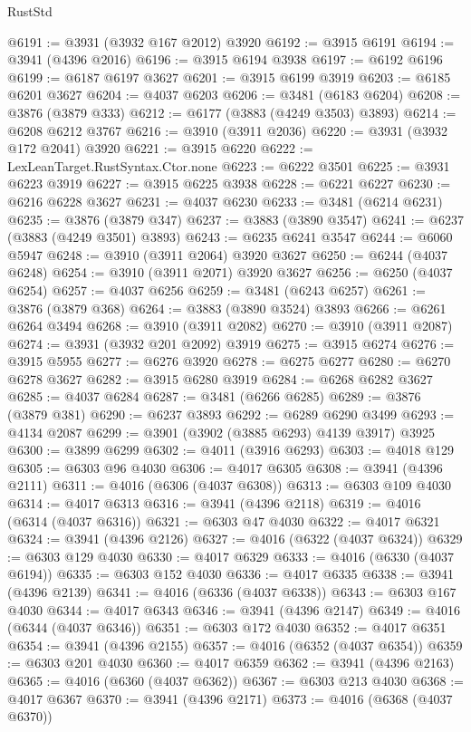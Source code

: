 \begin{lexlean}{RustStd}
\begin{coremodule}
@6191 := @3931 (@3932 @167 @2012) @3920
@6192 := @3915 @6191
@6194 := @3941 (@4396 @2016)
@6196 := @3915 @6194 @3938
@6197 := @6192 @6196
@6199 := @6187 @6197 @3627
@6201 := @3915 @6199 @3919
@6203 := @6185 @6201 @3627
@6204 := @4037 @6203
@6206 := @3481 (@6183 @6204)
@6208 := @3876 (@3879 @333)
@6212 := @6177 (@3883 (@4249 @3503) @3893)
@6214 := @6208 @6212 @3767
@6216 := @3910 (@3911 @2036)
@6220 := @3931 (@3932 @172 @2041) @3920
@6221 := @3915 @6220
@6222 := LexLeanTarget.RustSyntax.Ctor.none
@6223 := @6222 @3501
@6225 := @3931 @6223 @3919
@6227 := @3915 @6225 @3938
@6228 := @6221 @6227
@6230 := @6216 @6228 @3627
@6231 := @4037 @6230
@6233 := @3481 (@6214 @6231)
@6235 := @3876 (@3879 @347)
@6237 := @3883 (@3890 @3547)
@6241 := @6237 (@3883 (@4249 @3501) @3893)
@6243 := @6235 @6241 @3547
@6244 := @6060 @5947
@6248 := @3910 (@3911 @2064) @3920 @3627
@6250 := @6244 (@4037 @6248)
@6254 := @3910 (@3911 @2071) @3920 @3627
@6256 := @6250 (@4037 @6254)
@6257 := @4037 @6256
@6259 := @3481 (@6243 @6257)
@6261 := @3876 (@3879 @368)
@6264 := @3883 (@3890 @3524) @3893
@6266 := @6261 @6264 @3494
@6268 := @3910 (@3911 @2082)
@6270 := @3910 (@3911 @2087)
@6274 := @3931 (@3932 @201 @2092) @3919
@6275 := @3915 @6274
@6276 := @3915 @5955
@6277 := @6276 @3920
@6278 := @6275 @6277
@6280 := @6270 @6278 @3627
@6282 := @3915 @6280 @3919
@6284 := @6268 @6282 @3627
@6285 := @4037 @6284
@6287 := @3481 (@6266 @6285)
@6289 := @3876 (@3879 @381)
@6290 := @6237 @3893
@6292 := @6289 @6290 @3499
@6293 := @4134 @2087
@6299 := @3901 (@3902 (@3885 @6293) @4139 @3917) @3925
@6300 := @3899 @6299
@6302 := @4011 (@3916 @6293)
@6303 := @4018 @129
@6305 := @6303 @96 @4030
@6306 := @4017 @6305
@6308 := @3941 (@4396 @2111)
@6311 := @4016 (@6306 (@4037 @6308))
@6313 := @6303 @109 @4030
@6314 := @4017 @6313
@6316 := @3941 (@4396 @2118)
@6319 := @4016 (@6314 (@4037 @6316))
@6321 := @6303 @47 @4030
@6322 := @4017 @6321
@6324 := @3941 (@4396 @2126)
@6327 := @4016 (@6322 (@4037 @6324))
@6329 := @6303 @129 @4030
@6330 := @4017 @6329
@6333 := @4016 (@6330 (@4037 @6194))
@6335 := @6303 @152 @4030
@6336 := @4017 @6335
@6338 := @3941 (@4396 @2139)
@6341 := @4016 (@6336 (@4037 @6338))
@6343 := @6303 @167 @4030
@6344 := @4017 @6343
@6346 := @3941 (@4396 @2147)
@6349 := @4016 (@6344 (@4037 @6346))
@6351 := @6303 @172 @4030
@6352 := @4017 @6351
@6354 := @3941 (@4396 @2155)
@6357 := @4016 (@6352 (@4037 @6354))
@6359 := @6303 @201 @4030
@6360 := @4017 @6359
@6362 := @3941 (@4396 @2163)
@6365 := @4016 (@6360 (@4037 @6362))
@6367 := @6303 @213 @4030
@6368 := @4017 @6367
@6370 := @3941 (@4396 @2171)
@6373 := @4016 (@6368 (@4037 @6370))

\end{coremodule}
\end{lexlean}
